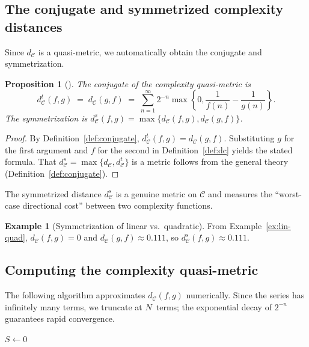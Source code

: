 \documentclass[11pt,a4paper]{article}
\theoremstyle{plain}
\newtheorem{propositioninner}[theoreminner]{Proposition}
\theoremstyle{definition}
\newtheorem{exampleinner}[theoreminner]{Example}
\newenvironment{proposition}[1][]{\begin{propositioninner}[#1]}{\end{propositioninner}}
\newenvironment{example}[1][]{\begin{exampleinner}[#1]}{\end{exampleinner}}
\newcommand{\C}{\mathcal{C}}
\begin{document}
\subsection{The conjugate and symmetrized complexity distances}

Since $d_\C$ is a quasi-metric, we automatically obtain the conjugate
and symmetrization.

\begin{proposition}\label{prop:conjugate-dc}
The conjugate of the complexity quasi-metric is
\[
  d_\C^t(f,g) \;=\; d_\C(g,f)
  \;=\; \sum_{n=1}^{\infty}2^{-n}\max\!\left\{0,\frac{1}{f(n)}-\frac{1}{g(n)}\right\}.
\]
The symmetrization is $d_\C^s(f,g)=\max\{d_\C(f,g),d_\C(g,f)\}$.
\end{proposition}

\begin{proof}
By Definition~\ref{def:conjugate}, $d_\C^t(f,g)=d_\C(g,f)$.
Substituting $g$ for the first argument and $f$ for the second
in Definition~\ref{def:dc} yields the stated formula.  That
$d_\C^s=\max\{d_\C,d_\C^t\}$ is a metric follows from the
general theory (Definition~\ref{def:conjugate}).
\end{proof}

The symmetrized distance $d_\C^s$ is a genuine metric on $\C$ and
measures the ``worst-case directional cost'' between two complexity
functions.

\begin{example}[Symmetrization of linear vs.\ quadratic]\label{ex:sym}
From Example~\ref{ex:lin-quad}, $d_\C(f,g)=0$ and
$d_\C(g,f)\approx 0.111$, so $d_\C^s(f,g)\approx 0.111$.
\end{example}


\subsection{Computing the complexity quasi-metric}

The following algorithm approximates $d_\C(f,g)$ numerically.
Since the series has infinitely many terms, we truncate at
$N$~terms; the exponential decay of $2^{-n}$ guarantees rapid
convergence.

\begin{algorithm}[H]
\DontPrintSemicolon
\SetAlgoLined
{}
\KwOut{Approximation of $d_\C(f,g)$}
$S \leftarrow 0$\;
\;
\caption{Compute $d_\C(f,g)$}
\label{alg:dc}
\end{algorithm}
\end{document}
